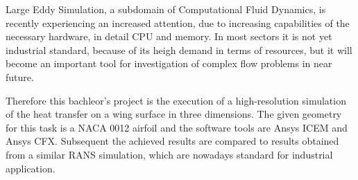 Large Eddy Simulation, a subdomain of Computational Fluid Dynamics, is recently experiencing an increased attention, due to increasing capabilities of the necessary hardware, in detail CPU and memory. In most sectors it is not yet industrial standard, because of its heigh demand in terms of resources, but it will become an important tool for investigation of complex flow problems in near future. 

Therefore this bachleor's project is the execution of a high-resolution simulation of the heat transfer on a wing surface in three dimensions. The given geometry for this task is a NACA 0012 airfoil and the software tools are Ansys ICEM and Ansys CFX. Subsequent the achieved results are compared to results obtained from a similar RANS simulation, which are nowadays standard for industrial application.